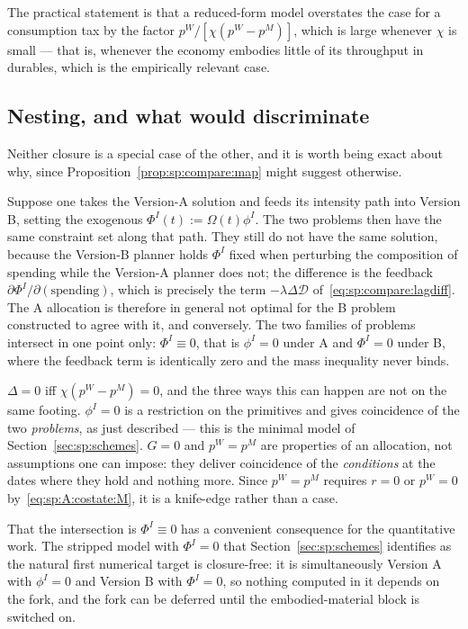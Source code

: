 The practical statement is that a reduced-form model overstates the case for a consumption tax by the
factor $p^W/\left[\chi\left(p^W-p^M\right)\right]$, which is large whenever $\chi$ is small --- that
is, whenever the economy embodies little of its throughput in durables, which is the empirically
relevant case.


\subsection{Nesting, and what would discriminate}\label{sec:sp:compare:nesting}

Neither closure is a special case of the other, and it is worth being exact about why, since
Proposition~\ref{prop:sp:compare:map} might suggest otherwise.

Suppose one takes the Version-A solution and feeds its intensity path into Version B, setting the
exogenous $\Phi^I(t):=\Omega(t)\phi^I$. The two problems then have the same constraint set along that
path. They still do not have the same solution, because the Version-B planner holds $\Phi^I$ fixed
when perturbing the composition of spending while the Version-A planner does not; the difference is
the feedback $\partial\Phi^I/\partial\left(\text{spending}\right)$, which is precisely the term
$-\lambda\Delta\mathcal D$ of~\eqref{eq:sp:compare:lagdiff}. The A allocation is therefore in general
not optimal for the B problem constructed to agree with it, and conversely. The two families of
problems intersect in one point only: $\Phi^I\equiv0$, that is $\phi^I=0$ under A and $\Phi^I=0$ under
B, where the feedback term is identically zero and the mass inequality never binds.

\begin{remark}\label{rem:sp:coincide}
$\Delta=0$ iff $\chi\left(p^W-p^M\right)=0$, and the three ways this can happen are not on the same
footing. $\phi^I=0$ is a restriction on the primitives and gives coincidence of the two \emph{problems},
as just described --- this is the minimal model of Section~\ref{sec:sp:schemes}. $G=0$ and $p^W=p^M$ are
properties of an allocation, not assumptions one can impose: they deliver coincidence of the
\emph{conditions} at the dates where they hold and nothing more. Since $p^W=p^M$ requires $r=0$ or
$p^W=0$ by~\eqref{eq:sp:A:costate:M}, it is a knife-edge rather than a case.
\end{remark}

That the intersection is $\Phi^I\equiv0$ has a convenient consequence for the quantitative work. The
stripped model with $\Phi^I=0$ that Section~\ref{sec:sp:schemes} identifies as the natural first
numerical target is closure-free: it is simultaneously Version A with $\phi^I=0$ and Version B with
$\Phi^I=0$, so nothing computed in it depends on the fork, and the fork can be deferred until the
embodied-material block is switched on.

